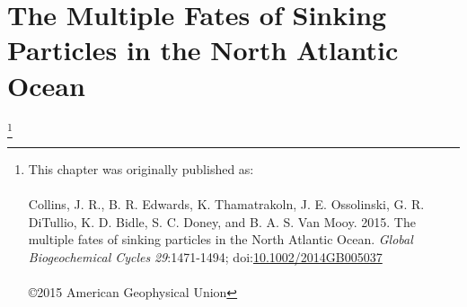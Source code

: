 
\begingroup%
\makeatletter%
\cleardoublepage%
\let\newpage\relax%
\let\clearpage\relax%
\vspace*{\fill}%
\vspace*{\dimexpr-50\p@-\baselineskip}%
\chapter{The Multiple Fates of Sinking Particles in the North Atlantic Ocean}
\label{chap2}
\let\thefootnote\relax\footnote{{\setlength{\parindent}{0pt}This chapter was originally published as:\\\\Collins, J. R., B. R. Edwards, K. Thamatrakoln, J. E. Ossolinski, G. R. DiTullio, K. D. Bidle, S. C. Doney, and B. A. S. Van Mooy. 2015. The multiple fates of sinking particles in the North Atlantic Ocean. \emph{Global Biogeochemical Cycles} \emph{29}:1471-1494; doi:\href{http://dx.doi.org/10.1002/2014GB005037}{10.1002/2014GB005037}\\\\\copyright 2015 American Geophysical Union}}
\vspace*{\fill}%
\endgroup%

\clearpage
